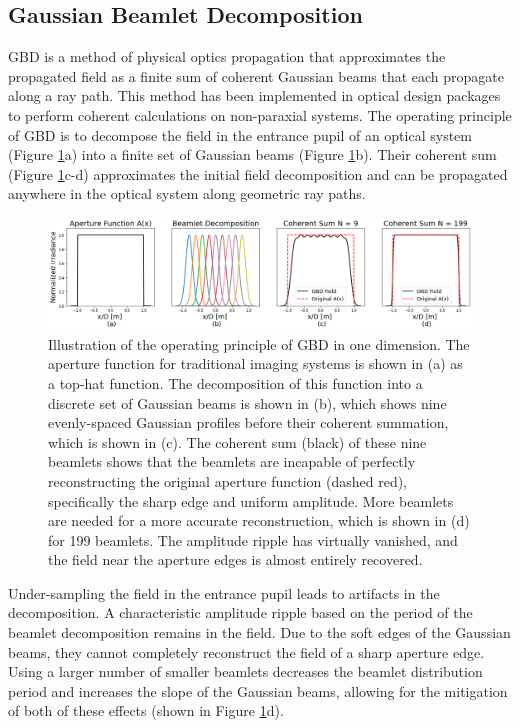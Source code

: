 \subsection{Gaussian Beamlet Decomposition}
GBD is a method of physical optics propagation that approximates the propagated field as a finite sum of coherent Gaussian beams that each propagate along a ray path. This method has been implemented in optical design packages \cite{greynolds_ten_2020} to perform coherent calculations on non-paraxial systems. The operating principle of GBD is to decompose the field in the entrance pupil of an optical system (Figure \ref{fig:gbd_essentials}a) into a finite set of Gaussian beams (Figure \ref{fig:gbd_essentials}b). Their coherent sum (Figure \ref{fig:gbd_essentials}c-d) approximates the initial field decomposition and can be propagated anywhere in the optical system along geometric ray paths.

\begin{figure}[H]
    \centering
    \includegraphics[width=\textwidth]{beamlet_decomposition_essentials.png}
    \caption{Illustration of the operating principle of GBD in one dimension. The aperture function for traditional imaging systems is shown in (a) as a top-hat function. The decomposition of this function into a discrete set of Gaussian beams is shown in (b), which shows nine evenly-spaced Gaussian profiles before their coherent summation, which is shown in (c). The coherent sum (black) of these nine beamlets shows that the beamlets are incapable of perfectly reconstructing the original aperture function (dashed red), specifically the sharp edge and uniform amplitude. More beamlets are needed for a more accurate reconstruction, which is shown in (d) for 199 beamlets. The amplitude ripple has virtually vanished, and the field near the aperture edges is almost entirely recovered.}
    \label{fig:gbd_essentials}
\end{figure}

Under-sampling the field in the entrance pupil leads to artifacts in the decomposition. A characteristic amplitude ripple based on the period of the beamlet decomposition remains in the field. Due to the soft edges of the Gaussian beams, they cannot completely reconstruct the field of a sharp aperture edge. Using a larger number of smaller beamlets decreases the beamlet distribution period and increases the slope of the Gaussian beams, allowing for the mitigation of both of these effects (shown in Figure \ref{fig:gbd_essentials}d).

